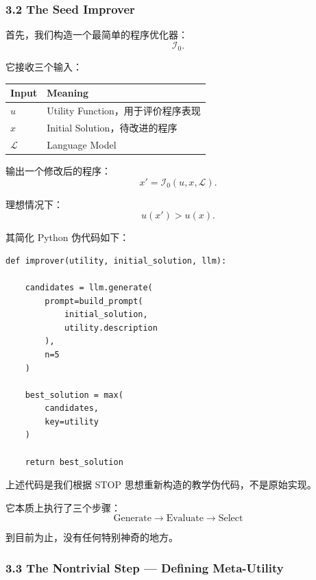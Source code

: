 \hypertarget{part-3-37-0001-the-seed-improver}{%
\subsubsection{3.2 The Seed Improver}\label{part-3-37-0001-the-seed-improver}}

首先，我们构造一个最简单的程序优化器：
\[\mathcal I_0.\]

它接收三个输入：

\begin{readertable}
\begin{longtable}[]{@{}
  >{\raggedright\arraybackslash}p{}
  >{\raggedright\arraybackslash}p{}@{}}
\toprule
Input & Meaning \\
\midrule
\endhead
\(u\) & Utility Function，用于评价程序表现 \\
\(x\) & Initial Solution，待改进的程序 \\
\(\mathcal L\) & Language Model \\
\bottomrule
\end{longtable}
\end{readertable}

输出一个修改后的程序：
\[x'=\mathcal I_0(u,x,\mathcal L).\]

理想情况下：
\[u(x')>u(x).\]

其简化 Python 伪代码如下：

\begin{verbatim}
def improver(utility, initial_solution, llm):

    candidates = llm.generate(
        prompt=build_prompt(
            initial_solution,
            utility.description
        ),
        n=5
    )

    best_solution = max(
        candidates,
        key=utility
    )

    return best_solution
\end{verbatim}

上述代码是我们根据 STOP 思想重新构造的教学伪代码，不是原始实现。

它本质上执行了三个步骤：
\[\boxed{
\text{Generate}
\rightarrow
\text{Evaluate}
\rightarrow
\text{Select}
}\]

到目前为止，没有任何特别神奇的地方。

\hypertarget{part-3-37-0001-the-nontrivial-step-defining-meta-utility}{%
\subsubsection{3.3 The Nontrivial Step --- Defining Meta-Utility}\label{part-3-37-0001-the-nontrivial-step-defining-meta-utility}}


